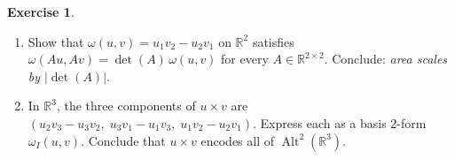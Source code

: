 \documentclass[11pt]{article}
\theoremstyle{definition}
\newtheorem{exercise}{Exercise}[section]
\theoremstyle{plain}
\begin{document}
\begin{exercise}
  \leavevmode
  \begin{enumerate}
    \item Show that $\omega(u,v) = u_1v_2 - u_2v_1$ on $\mathbb{R}^2$
          satisfies $\omega(Au,Av) = \det(A)\,\omega(u,v)$ for every
          $A\in\mathbb{R}^{2\times 2}$.  Conclude: \emph{area scales
          by $|\det(A)|$}.
    \item In $\mathbb{R}^3$, the three components of $u\times v$ are
          $(u_2v_3-u_3v_2,\; u_3v_1-u_1v_3,\; u_1v_2-u_2v_1)$.
          Express each as a basis 2-form $\omega_I(u,v)$.
          Conclude that $u\times v$ encodes all of
          $\operatorname{Alt}^2(\mathbb{R}^3)$.
  \end{enumerate}
\end{exercise}
\end{document}
